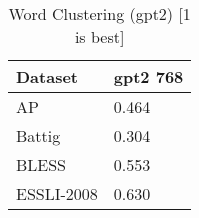 \begin{table}[]
\centering
\begin{tabular}{l|l}
\hline
Dataset & gpt2 768 \\
\hline
AP & 0.464 \\ 
Battig & 0.304 \\ 
BLESS & 0.553 \\ 
ESSLI-2008 & 0.630
\end{tabular}
\caption{Word Clustering (gpt2) [1 is best]}
\label{tab:cluster-gpt2}
\end{table}
